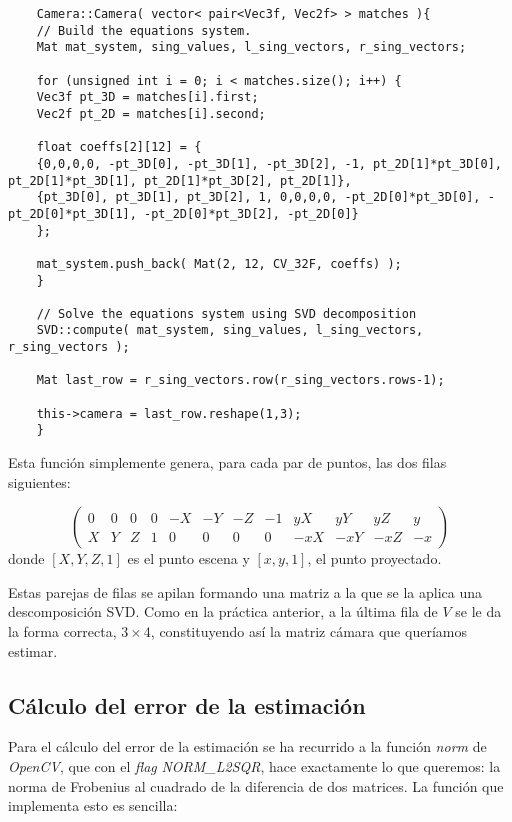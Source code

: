 \documentclass[a4paper, 11pt]{article}
\theoremstyle{definition}
\theoremstyle{theorem}
\begin{document}
    \begin{lstlisting}
    Camera::Camera( vector< pair<Vec3f, Vec2f> > matches ){
    // Build the equations system.
    Mat mat_system, sing_values, l_sing_vectors, r_sing_vectors;

    for (unsigned int i = 0; i < matches.size(); i++) {
    Vec3f pt_3D = matches[i].first;
    Vec2f pt_2D = matches[i].second;

    float coeffs[2][12] = {
    {0,0,0,0, -pt_3D[0], -pt_3D[1], -pt_3D[2], -1, pt_2D[1]*pt_3D[0], pt_2D[1]*pt_3D[1], pt_2D[1]*pt_3D[2], pt_2D[1]},
    {pt_3D[0], pt_3D[1], pt_3D[2], 1, 0,0,0,0, -pt_2D[0]*pt_3D[0], -pt_2D[0]*pt_3D[1], -pt_2D[0]*pt_3D[2], -pt_2D[0]}
    };

    mat_system.push_back( Mat(2, 12, CV_32F, coeffs) );
    }

    // Solve the equations system using SVD decomposition
    SVD::compute( mat_system, sing_values, l_sing_vectors, r_sing_vectors );

    Mat last_row = r_sing_vectors.row(r_sing_vectors.rows-1);

    this->camera = last_row.reshape(1,3);
    }
    \end{lstlisting}

    Esta función simplemente genera, para cada par de puntos, las dos filas siguientes:

    \[
    \left(
    \begin{array}{cccccccccccc}
        0 & 0 & 0 & 0 & -X & -Y & -Z & -1 & yX & yY & yZ & y \\
        X & Y & Z & 1 & 0 & 0 & 0 & 0 & -xX & -xY & -xZ & -x
    \end{array}
    \right)
    \]
    donde $[X,Y,Z,1]$ es el punto escena y $[x,y,1]$, el punto proyectado.

    Estas parejas de filas se apilan formando una matriz a la que se la aplica una descomposición SVD. Como en la práctica anterior, a la última fila de $V$ se le da la forma correcta, $3\times4$, constituyendo así la matriz cámara que queríamos estimar.

    \subsection{Cálculo del error de la estimación}
    Para el cálculo del error de la estimación se ha recurrido a la función \emph{norm} de \emph{OpenCV}, que con el \emph{flag} \emph{NORM\_L2SQR}, hace exactamente lo que queremos: la norma de Frobenius al cuadrado de la diferencia de dos matrices. La función que implementa esto es sencilla:
\end{document}
